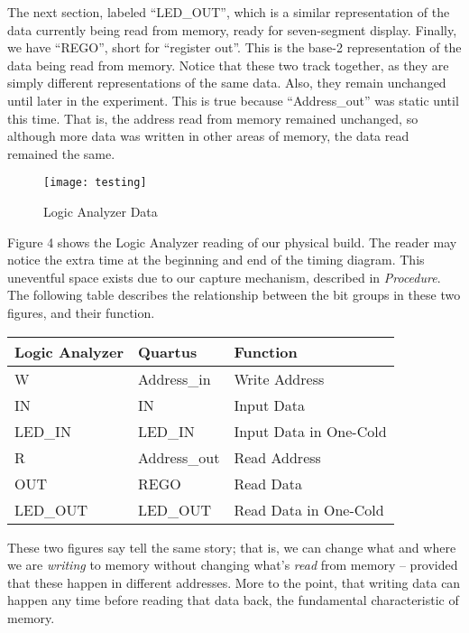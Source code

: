 \documentclass[titlepage]{article}
\begin{document}
        The next section, labeled ``LED\_OUT'', 
        which is a similar representation of the data currently being read from memory, ready for seven-segment display.
        Finally, we have ``REGO'', short for ``register out''.  This is the base-2 representation of the data being read from memory.
        Notice that these two track together, as they are simply different representations of the same data.
        Also, they remain unchanged until later in the experiment.  This is true because ``Address\_out'' was static until this time.  That is, the address read from memory remained unchanged, so although more data was written in other areas of memory, the data read remained the same.
        
        \begin{figure}[h]
        	\centering
        	\texttt{[image: testing]}
        	\caption{Logic Analyzer Data}
        \end{figure}
        
        Figure 4 shows the Logic Analyzer reading of our physical build.
        The reader may notice the extra time at the beginning and end of the timing diagram.
        This uneventful space exists due to our capture mechanism, described in \textit{Procedure}.
        The following table describes the relationship between the bit groups in these two figures, and their function.
        
        \begin{center}
        \begin{tabular}{ll | l}
        	
            Logic Analyzer & Quartus & Function \\
            \hline
            W & Address\_in & Write Address \\
            IN & IN & Input Data \\
            LED\_IN & LED\_IN & Input Data in One-Cold \\
            R & Address\_out & Read Address \\
            OUT & REGO & Read Data \\
            LED\_OUT & LED\_OUT & Read Data in One-Cold \\
            
        \end{tabular}
        \end{center}
        These two figures say tell the same story; that is, we can change what and where we are \textit{writing} to memory without changing what's \textit{read} from memory -- provided that these happen in different addresses.
        More to the point, that writing data can happen any time before reading that data back, the fundamental characteristic of memory.
        
\end{document}
